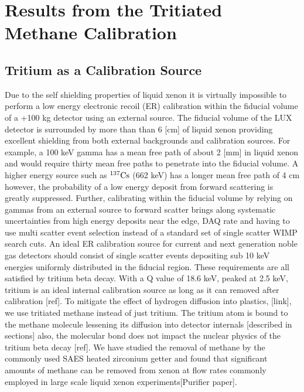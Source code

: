 
\section{Results from the Tritiated Methane Calibration}

\subsection{Tritium as a Calibration Source}

Due to the self shielding properties of liquid xenon it is virtually impossible to perform a low energy electronic recoil (ER) calibration within the fiducial volume of a +100 kg detector using an external source. The fiducial volume of the LUX detector is surrounded by more than than 6 [cm] of liquid xenon providing excellent shielding from both external backgrounds and calibration sources. For example, a 100 keV gamma has a mean free path of about 2 [mm] in liquid xenon and would require thirty mean free paths to penetrate into the fiducial volume. A higher energy source such as $\rm ^{137}Cs$ (662 keV) has a longer mean free path of 4 cm however, the probability of a low energy deposit from forward scattering is greatly suppressed. Further, calibrating within the fiducial volume by relying on gammas from an external source to forward scatter brings along systematic uncertainties from high energy deposits near the edge, DAQ rate and having to use  multi scatter event selection instead of a standard set of single scatter WIMP search cuts. An ideal ER calibration source for current and next generation noble gas detectors should consist of single scatter events depositing sub 10 keV energies uniformly distributed in the fiducial region. These requirements are all satisfied by tritium beta decay. With a Q value of 18.6 keV, peaked at 2.5 keV, tritium is an ideal internal calibration source as long as it can removed after calibration [ref]. To mitigate the effect of hydrogen diffusion into plastics, [link], we use tritiated methane instead of just tritium. The tritium atom is bound to the methane molecule lessening its diffusion into detector internals [described in sections] also, the molecular bond does not impact the nuclear physics of the tritium beta decay [ref]. We have studied the removal of methane by the commonly used SAES heated zirconium getter and found that significant amounts of methane can be removed from xenon at flow rates commonly employed in large scale liquid xenon experiments[Purifier paper].

